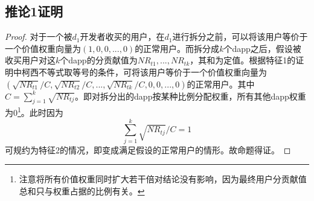 \subsection{推论1证明}
\begin{proof}
	对于一个被$d_1$开发者收买的用户，在$d_1$进行拆分之前，可以将该用户等价于一个价值权重向量为$(1,0,0,...,0)$的正常用户。而拆分成$k$个dapp之后，假设被收买用户对这$k$个dapp的分贡献值为$NR_{t1},...,NR_{tk}$，其和为定值。根据特征1的证明中柯西不等式取等号的条件，可将该用户等价于一个价值权重向量为$(\sqrt{NR_{t1}}/C,\sqrt{NR_{t2}}/C,...,\sqrt{NR_{tk}}/C,0,0,...,0)$的正常用户。其中$C=\sum_{j=1}^k \sqrt{NR_{tj}}$。即对拆分出的dapp按某种比例分配权重，所有其他dapp权重为0\footnote{注意将所有价值权重同时扩大若干倍对结论没有影响，因为最终用户分贡献值总和只与权重占据的比例有关。}。此时因为
	$$\sum_{j=1}^k \sqrt{NR_{tj}}/C =1$$
	可规约为特征2的情况，即变成满足假设的正常用户的情形。故命题得证。
\end{proof}
